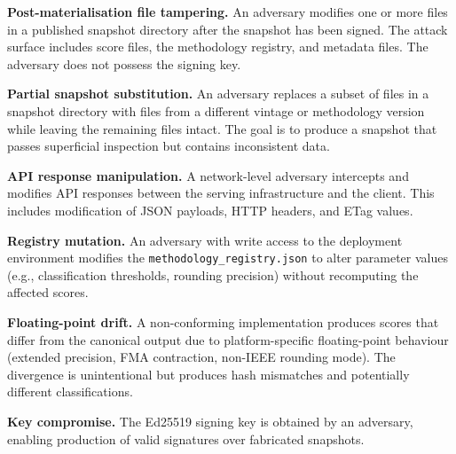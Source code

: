 \begin{description}[style=nextline, leftmargin=3.5em, labelwidth=3em]

  \item[\textbf{A-1}] \textbf{Post-materialisation file tampering.}\enspace
    An adversary modifies one or more files in a published snapshot directory
    after the snapshot has been signed.  The attack surface includes score
    files, the methodology registry, and metadata files.  The adversary does
    not possess the signing key.

  \item[\textbf{A-2}] \textbf{Partial snapshot substitution.}\enspace
    An adversary replaces a subset of files in a snapshot directory
    with files from a different vintage or methodology version while
    leaving the remaining files intact.  The goal is to produce a snapshot
    that passes superficial inspection but contains inconsistent data.

  \item[\textbf{A-3}] \textbf{API response manipulation.}\enspace
    A network-level adversary intercepts and modifies API responses between
    the serving infrastructure and the client.  This includes modification
    of JSON payloads, HTTP headers, and ETag values.

  \item[\textbf{A-4}] \textbf{Registry mutation.}\enspace
    An adversary with write access to the deployment environment modifies
    the \texttt{methodology\_registry.json} to alter parameter values
    (e.g., classification thresholds, rounding precision) without
    recomputing the affected scores.

  \item[\textbf{A-5}] \textbf{Floating-point drift.}\enspace
    A non-conforming implementation produces scores that differ from the
    canonical output due to platform-specific floating-point behaviour
    (extended precision, FMA contraction, non-IEEE rounding mode).  The
    divergence is unintentional but produces hash mismatches and
    potentially different classifications.

  \item[\textbf{A-6}] \textbf{Key compromise.}\enspace
    The Ed25519 signing key is obtained by an adversary, enabling
    production of valid signatures over fabricated snapshots.

\end{description}

